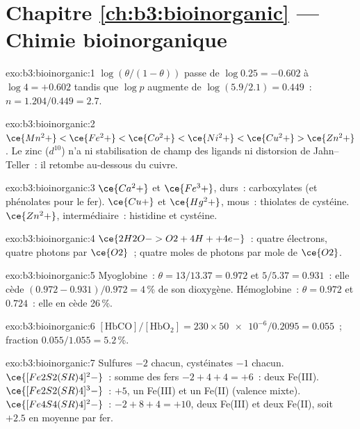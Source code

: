 \section*{Chapitre \ref{ch:b3:bioinorganic} --- Chimie bioinorganique}

\begin{solution}{exo:b3:bioinorganic:1}
$\log(\theta/(1 - \theta))$ passe de $\log 0.25 = -0.602$ à $\log 4 = +0.602$ tandis que $\log p$ augmente de
$\log(5.9/2.1) = 0.449$~: $n = 1.204/0.449 = 2.7$.
\end{solution}

\begin{solution}{exo:b3:bioinorganic:2}
$\ce{Mn^2+} < \ce{Fe^2+} < \ce{Co^2+} < \ce{Ni^2+} < \ce{Cu^2+} > \ce{Zn^2+}$. Le zinc ($d^{10}$) n'a ni stabilisation de champ des ligands ni
distorsion de Jahn--Teller~: il retombe au-dessous du cuivre.
\end{solution}

\begin{solution}{exo:b3:bioinorganic:3}
$\ce{Ca^2+}$ et $\ce{Fe^3+}$, durs~: carboxylates (et phénolates pour le fer). $\ce{Cu+}$ et $\ce{Hg^2+}$, mous~:
thiolates de cystéine. $\ce{Zn^2+}$, intermédiaire~: histidine et cystéine.
\end{solution}

\begin{solution}{exo:b3:bioinorganic:4}
$\ce{2H2O -> O2 + 4H+ + 4e-}$~: quatre électrons, quatre photons par $\ce{O2}$~; quatre moles de photons par
mole de $\ce{O2}$.
\end{solution}

\begin{solution}{exo:b3:bioinorganic:5}
Myoglobine~: $\theta = 13/13.37 = 0.972$ et $5/5.37 = 0.931$~: elle cède $(0.972 - 0.931)/0.972 = 4$\,\% de son
dioxygène. Hémoglobine~: $\theta = 0.972$ et $0.724$~: elle en cède 26\,\%.
\end{solution}

\begin{solution}{exo:b3:bioinorganic:6}
$[\mathrm{HbCO}]/[\mathrm{HbO_2}] = 230 \times \num{50e-6}/0.2095 = 0.055$~; fraction $0.055/1.055 = 5.2$\,\%.
\end{solution}

\begin{solution}{exo:b3:bioinorganic:7}
Sulfures $-2$ chacun, cystéinates $-1$ chacun. $\ce{[Fe2S2(SR)4]^2-}$~: somme des fers $-2 + 4 + 4 = +6$~: deux
Fe(III). $\ce{[Fe2S2(SR)4]^3-}$~: $+5$, un Fe(III) et un Fe(II) (valence mixte). $\ce{[Fe4S4(SR)4]^2-}$~:
$-2 + 8 + 4 = +10$, deux Fe(III) et deux Fe(II), soit $+2.5$ en moyenne par fer.
\end{solution}

